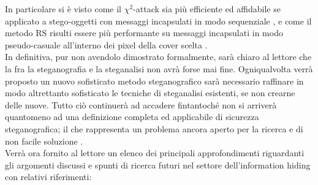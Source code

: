 In particolare si è visto come il $\chi ^2$-attack sia più efficiente ed affidabile se applicato a stego-oggetti con messaggi incapsulati in modo sequenziale \cite{chisq}, e come il metodo RS risulti essere più performante su messaggi incapsulati in modo pseudo-casuale all'interno dei pixel della cover scelta \cite{fried1, fried2}.\\In definitiva, pur non avendolo dimostrato formalmente, sarà chiaro al lettore che la  fra la steganografia e la steganalisi non avrà forse mai fine. Ogniqualvolta verrà proposto un nuovo sofisticato metodo steganografico sarà necessario raffinare in modo altrettanto sofisticato le tecniche di steganalisi esistenti, se non crearne delle nuove. Tutto ciò continuerà ad accadere fintantoché non si arriverà quantomeno ad una definizione completa ed applicabile di sicurezza steganografica; il che rappresenta un problema ancora aperto per la ricerca e di non facile soluzione \cite{sec, seeingTheUnseen, warfare}.\\Verrà ora fornito al lettore un elenco dei principali approfondimenti riguardanti gli argomenti discussi e spunti di ricerca futuri nel settore dell'information hiding con relativi riferimenti:  
